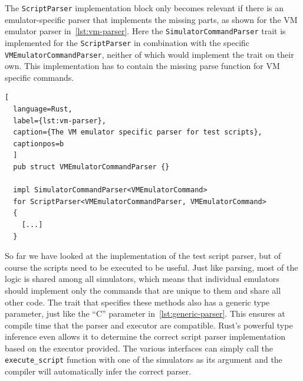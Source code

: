 The \verb+ScriptParser+ implementation block only becomes relevant if there is an emulator-specific parser that implements the missing parts, as shown for the VM emulator parser in~\cref{lst:vm-parser}.
Here the \verb+SimulatorCommandParser+ trait is implemented for the \verb+ScriptParser+ in combination with the specific \verb+VMEmulatorCommandParser+, neither of which would implement the trait on their own.
This implementation has to contain the missing parse function for VM specific commands.
\begin{lstlisting}[
  language=Rust,
  label={lst:vm-parser},
  caption={The VM emulator specific parser for test scripts},
  captionpos=b
  ]
  pub struct VMEmulatorCommandParser {}

  impl SimulatorCommandParser<VMEmulatorCommand>
  for ScriptParser<VMEmulatorCommandParser, VMEmulatorCommand>
  {
    [...]
  }
\end{lstlisting}

So far we have looked at the implementation of the test script parser, but of course the scripts need to be executed to be useful.
Just like parsing, most of the logic is shared among all simulators, which means that individual emulators should implement only the commands that are unique to them and share all other code.
The trait that specifies these methods also has a generic type parameter, just like the ``C'' parameter in~\cref{lst:generic-parser}.
This ensures at compile time that the parser and executor are compatible.
Rust's powerful type inference even allows it to determine the correct script parser implementation based on the executor provided.
The various interfaces can simply call the \verb+execute_script+ function with one of the simulators as its argument and the compiler will automatically infer the correct parser.

